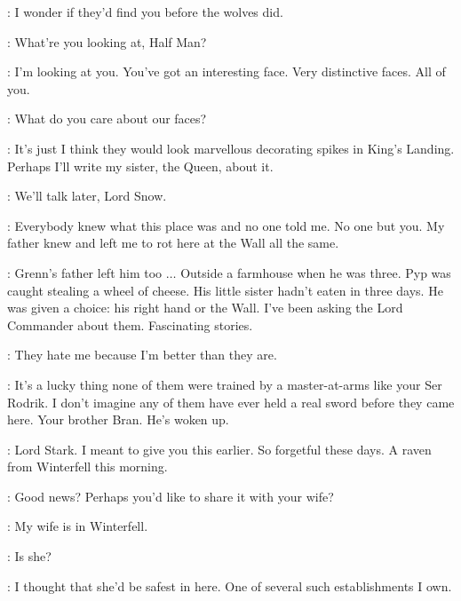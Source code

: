 \PYP: I wonder if they'd find you before the wolves did. 

\GRENN:  What're you looking at, Half Man? 

\TYRION: I'm looking at you. You've got an interesting face. Very distinctive faces. All of you. 

\RAST: What do you care about our faces? 

\TYRION: It's just I think they would look marvellous decorating spikes in King's Landing. Perhaps I'll write my sister, the Queen, about it. 

\GRENN: We'll talk later, Lord Snow. 


\JON: Everybody knew what this place was and no one told me. No one but you. My father knew and left me to rot here at the Wall all the same. 

\TYRION: Grenn's father left him too $\ldots$ Outside a farmhouse when he was three. Pyp was caught stealing a wheel of cheese. His little sister hadn't eaten in three days. He was given a choice: his right hand or the Wall. I've been asking the Lord Commander about them. Fascinating stories. 

\JON: They hate me because I'm better than they are. 

\TYRION: It's a lucky thing none of them were trained by a master-at-arms like your Ser Rodrik. I don't imagine any of them have ever held a real sword before they came here. Your brother Bran. He's woken up. 


\scene



\PYCELLE: Lord Stark. I meant to give you this earlier. So forgetful these days. A raven from Winterfell this morning. 


\LITTLEFINGER: Good news? Perhaps you'd like to share it with your wife? 

\NED: My wife is in Winterfell. 

\LITTLEFINGER: Is she? 


\LITTLEFINGER: I thought that she'd be safest in here. One of several such establishments I own. 

